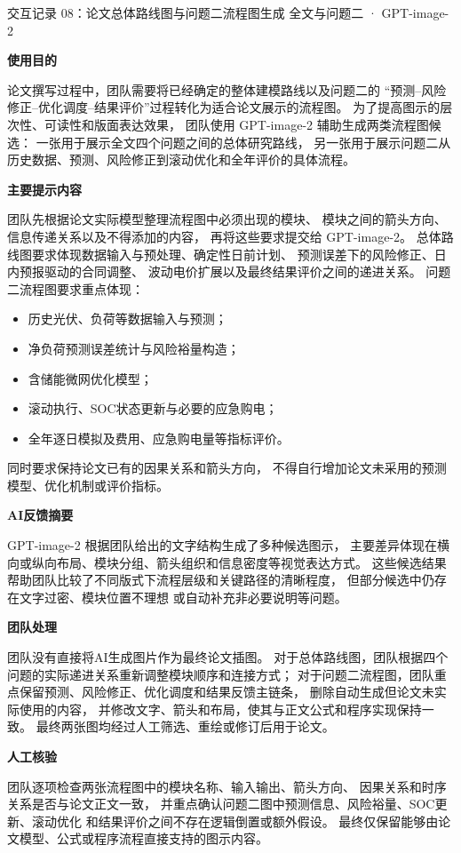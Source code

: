 \documentclass[UTF8,a4paper,11pt]{ctexart}
\newcommand{\recorditem}[1]{%
    \par\vspace{0.28em}
    \noindent\textbf{#1}\quad
}
\begin{document}
\begin{recordbox}
{交互记录 08：论文总体路线图与问题二流程图生成}
{全文与问题二 · GPT-image-2}

\recorditem{使用目的}
论文撰写过程中，团队需要将已经确定的整体建模路线以及问题二的
“预测--风险修正--优化调度--结果评价”过程转化为适合论文展示的流程图。
为了提高图示的层次性、可读性和版面表达效果，
团队使用 GPT-image-2 辅助生成两类流程图候选：
一张用于展示全文四个问题之间的总体研究路线，
另一张用于展示问题二从历史数据、预测、风险修正到滚动优化和全年评价的具体流程。

\recorditem{主要提示内容}
团队先根据论文实际模型整理流程图中必须出现的模块、
模块之间的箭头方向、信息传递关系以及不得添加的内容，
再将这些要求提交给 GPT-image-2。
总体路线图要求体现数据输入与预处理、确定性日前计划、
预测误差下的风险修正、日内预报驱动的合同调整、
波动电价扩展以及最终结果评价之间的递进关系。
问题二流程图要求重点体现：
\begin{itemize}
    \item 历史光伏、负荷等数据输入与预测；
    \item 净负荷预测误差统计与风险裕量构造；
    \item 含储能微网优化模型；
    \item 滚动执行、SOC状态更新与必要的应急购电；
    \item 全年逐日模拟及费用、应急购电量等指标评价。
\end{itemize}
同时要求保持论文已有的因果关系和箭头方向，
不得自行增加论文未采用的预测模型、优化机制或评价指标。

\recorditem{AI反馈摘要}
GPT-image-2 根据团队给出的文字结构生成了多种候选图示，
主要差异体现在横向或纵向布局、模块分组、箭头组织和信息密度等视觉表达方式。
这些候选结果帮助团队比较了不同版式下流程层级和关键路径的清晰程度，
但部分候选中仍存在文字过密、模块位置不理想
或自动补充非必要说明等问题。

\recorditem{团队处理}
团队没有直接将AI生成图片作为最终论文插图。
对于总体路线图，团队根据四个问题的实际递进关系重新调整模块顺序和连接方式；
对于问题二流程图，团队重点保留预测、风险修正、优化调度和结果反馈主链条，
删除自动生成但论文未实际使用的内容，
并修改文字、箭头和布局，使其与正文公式和程序实现保持一致。
最终两张图均经过人工筛选、重绘或修订后用于论文。

\recorditem{人工核验}
团队逐项检查两张流程图中的模块名称、输入输出、箭头方向、
因果关系和时序关系是否与论文正文一致，
并重点确认问题二图中预测信息、风险裕量、SOC更新、滚动优化
和结果评价之间不存在逻辑倒置或额外假设。
最终仅保留能够由论文模型、公式或程序流程直接支持的图示内容。
\end{recordbox}
\end{document}
